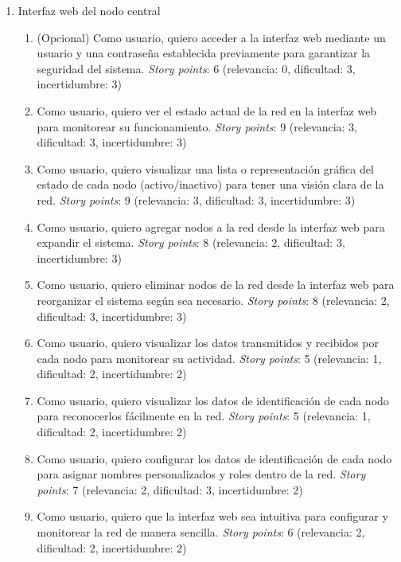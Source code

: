 \documentclass[
11pt, %
]{charter}
\begin{document}
\begin{enumerate}
\item Interfaz web del nodo central
\begin{enumerate}
 	\item (Opcional) Como usuario, quiero acceder a la interfaz web mediante un usuario y una contraseña establecida previamente para garantizar la seguridad del sistema. \textit{Story points}: 6 (relevancia: 0, dificultad: 3, incertidumbre: 3)
 
	\item Como usuario, quiero ver el estado actual de la red en la interfaz web para monitorear su funcionamiento. \textit{Story points}: 9 (relevancia: 3, dificultad: 3, incertidumbre: 3)

	\item Como usuario, quiero visualizar una lista o representación gráfica del estado de cada nodo (activo/inactivo) para tener una visión clara de la red. \textit{Story points}: 9 (relevancia: 3, dificultad: 3, incertidumbre: 3)

	\item Como usuario, quiero agregar nodos a la red desde la interfaz web para expandir el sistema. \textit{Story points}: 8 (relevancia: 2, dificultad: 3, incertidumbre: 3)

	\item Como usuario, quiero eliminar nodos de la red desde la interfaz web para reorganizar el sistema según sea necesario. \textit{Story points}: 8 (relevancia: 2, dificultad: 3, incertidumbre: 3)

	\item Como usuario, quiero visualizar los datos transmitidos y recibidos por cada nodo para monitorear su actividad. \textit{Story points}: 5 (relevancia: 1, dificultad: 2, incertidumbre: 2)

	\item Como usuario, quiero visualizar los datos de identificación de cada nodo para reconocerlos fácilmente en la red. \textit{Story points}: 5 (relevancia: 1, dificultad: 2, incertidumbre: 2)

	\item Como usuario, quiero configurar los datos de identificación de cada nodo para asignar nombres personalizados y roles dentro de la red. \textit{Story points}: 7 (relevancia: 2, dificultad: 3, incertidumbre: 2)

	\item Como usuario, quiero que la interfaz web sea intuitiva para configurar y monitorear la red de manera sencilla. \textit{Story points}: 6 (relevancia: 2, dificultad: 2, incertidumbre: 2)


\end{enumerate}
\end{enumerate}
\end{document}
